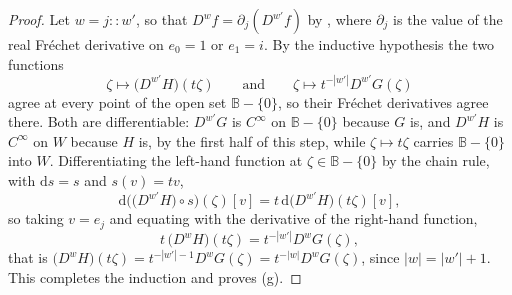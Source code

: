 \begin{proof}
Let $w=j\colon\!\!\colon w'$, so that $D^{w}f=\partial_j(D^{w'}f)$ by
, where $\partial_j$ is the value of the real Fréchet
derivative on $e_0=1$ or $e_1=i$.  By the inductive hypothesis the two
functions
\[
  \zeta\mapsto\bigl(D^{w'}H\bigr)(t\zeta)
  \qquad\text{and}\qquad
  \zeta\mapsto t^{-|w'|}D^{w'}G(\zeta)
\]
agree at every point of the open set $\mathbb{B}-\{0\}$, so their Fréchet
derivatives agree there.  Both are differentiable: $D^{w'}G$ is $C^\infty$ on
$\mathbb{B}-\{0\}$ because $G$ is, and $D^{w'}H$ is $C^\infty$ on $W$ because
$H$ is, by the first half of this step, while $\zeta\mapsto t\zeta$ carries
$\mathbb{B}-\{0\}$ into $W$.  Differentiating the left-hand function at
$\zeta\in\mathbb{B}-\{0\}$ by the chain rule, with $\mathrm{d}s=s$ and
$s(v)=tv$,
\[
  \mathrm{d}\bigl(\bigl(D^{w'}H\bigr)\circ s\bigr)(\zeta)[v]
  =t\,\mathrm{d}\bigl(D^{w'}H\bigr)(t\zeta)[v],
\]
so taking $v=e_j$ and equating with the derivative of the right-hand function,
\[
  t\,\bigl(D^{w}H\bigr)(t\zeta)=t^{-|w'|}D^{w}G(\zeta),
\]
that is $\bigl(D^{w}H\bigr)(t\zeta)=t^{-|w'|-1}D^{w}G(\zeta)
=t^{-|w|}D^{w}G(\zeta)$, since $|w|=|w'|+1$.  This completes the induction and
proves (g).
\end{proof}
